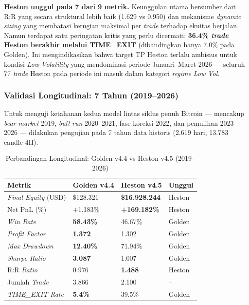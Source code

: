 \textbf{Heston unggul pada 7 dari 9 metrik.} Keunggulan utama bersumber dari R:R yang secara struktural lebih baik (1.629 vs 0.950) dan mekanisme \textit{dynamic sizing} yang membatasi kerugian maksimal per \textit{trade} terhadap ekuitas berjalan. Namun terdapat satu peringatan kritis yang perlu dicermati: \textbf{36.4\% \textit{trade} Heston berakhir melalui TIME\_EXIT} (dibandingkan hanya 7.0\% pada Golden). Ini mengindikasikan bahwa target TP Heston terlalu ambisius untuk kondisi \textit{Low Volatility} yang mendominasi periode Januari--Maret 2026 --- seluruh 77 \textit{trade} Heston pada periode ini masuk dalam kategori \textit{regime} \textit{Low Vol}.

\subsubsection{Validasi Longitudinal: 7 Tahun (2019--2026)}

Untuk menguji ketahanan kedua model lintas siklus penuh Bitcoin --- mencakup \textit{bear market} 2019, \textit{bull run} 2020--2021, fase koreksi 2022, dan pemulihan 2023--2026 --- dilakukan pengujian pada 7 tahun data historis (2.619 hari, 13.783 candle 4H).

\begin{table}[h!]
\centering
\caption{Perbandingan Longitudinal: Golden v4.4 vs Heston v4.5 (2019--2026)}
\label{table:evo_7y}
\begin{tabular}{@{}llll@{}}
\toprule
\textbf{Metrik}              & \textbf{Golden v4.4} & \textbf{Heston v4.5}   & \textbf{Unggul} \\ \midrule
\textit{Final Equity} (USD)  & \$128.321            & \textbf{\$16.928.244}  & Heston \\
Net PnL (\%)                 & +1.183\%             & \textbf{+169.182\%}    & Heston \\
\textit{Win Rate}            & \textbf{58.43\%}     & 46.67\%                & Golden \\
\textit{Profit Factor}       & \textbf{1.372}       & 1.302                  & Golden \\
\textit{Max Drawdown}        & \textbf{12.40\%}     & 71.94\%                & Golden \\
\textit{Sharpe Ratio}        & \textbf{3.087}       & 1.007                  & Golden \\
R:R \textit{Ratio}           & 0.976                & \textbf{1.488}         & Heston \\
Jumlah \textit{Trade}        & 3.866                & 2.100                  & -- \\
\textit{TIME\_EXIT Rate}     & \textbf{5.4\%}       & 39.5\%                 & Golden \\
\bottomrule
\end{tabular}
\end{table}

